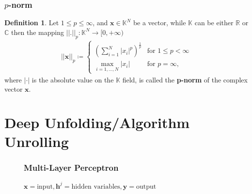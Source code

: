 \documentclass{beamer}
\theoremstyle{definition}
\newtheorem {Def} [Thm]{Definition}
\theoremstyle{remark}
\begin{document}

\begin{frame}
  \frametitle{$p$-norm}
  \begin{Def}\label{def:p-norm}
    Let $1 \leq p \leq \infty$, and $\boldsymbol{x} \in \mathbb{K}^N$ be a vector, while $\mathbb{K}$ can be either $\mathbb{R}$ or $\mathbb{C}$ then the mapping $\left|\left| \boldsymbol{.} \right|\right|_p \colon \mathbb{K}^N \to [0,+\infty)$
    \begin{equation}
        \begin{split} 
            \left|\left|\boldsymbol{x}\right|\right|_p \coloneqq    
            \begin{cases}
                \left(\sum_{i=1}^{N}\left|x_i\right|^p\right)^{\frac{1}{p}} & \text{for } 1 \leq p < \infty\\
                \underset{{i=1,\dots,N}}{\max} \left|x_i\right| & \text{for } p = \infty,
            \end{cases}
        \end{split}
    \end{equation}
    where $\left|\boldsymbol{\cdot}\right|$ is the absolute value on the $\mathbb{K}$ field,
    is called the \textbf{p-norm} of the complex vector $\boldsymbol{x}$.
\end{Def}

\end{frame}


\section[Deep Unfolding]{Deep Unfolding/Algorithm Unrolling}

\begin{frame}
  \begin{figure}
    \frametitle{Multi-Layer Perceptron}
    \centering
    \resizebox{1.0\textwidth}{!}{}
    \caption{$\boldsymbol{x} =\text{input},\boldsymbol{h}^j=\text{hidden variables},\boldsymbol{y}=\text{output}$}
    \label{fig:multi_layer_perceptron}
  \end{figure}
\end{frame}
\end{document}

